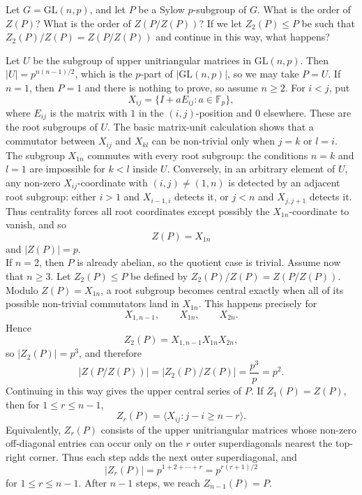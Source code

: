 \documentclass[../Odyssey_Project.tex]{subfiles}
\begin{document}
\begin{exercise}
\label{ex:8.3}
Let $G = \mathrm{GL}(n,p)$, and let $P$ be a Sylow $p$-subgroup of $G$. What is the order of $Z(P)$? What is the order of $Z(P/Z(P))$? If we let $Z_2(P) \leq P$ be such that $Z_2(P)/Z(P) = Z(P/Z(P))$ and continue in this way, what happens?
\end{exercise}
\begin{solution}
Let $U$ be the subgroup of upper unitriangular matrices in $\mathrm{GL}(n,p)$. Then $\lvert U\rvert=p^{n(n-1)/2}$, which is the $p$-part of $\lvert \mathrm{GL}(n,p)\rvert$, so we may take $P=U$. If $n=1$, then $P=1$ and there is nothing to prove, so assume $n\geq 2$. For $i<j$, put
\[
    X_{ij}=\{I+aE_{ij}:a\in\mathbb{F}_p\},
\]
where $E_{ij}$ is the matrix with $1$ in the $(i,j)$-position and $0$ elsewhere. These are the root subgroups of $U$. The basic matrix-unit calculation shows that a commutator between $X_{ij}$ and $X_{kl}$ can be non-trivial only when $j=k$ or $l=i$.\\
The subgroup $X_{1n}$ commutes with every root subgroup: the conditions $n=k$ and $l=1$ are impossible for $k<l$ inside $U$. Conversely, in an arbitrary element of $U$, any non-zero $X_{ij}$-coordinate with $(i,j)\neq(1,n)$ is detected by an adjacent root subgroup: either $i>1$ and $X_{i-1,i}$ detects it, or $j<n$ and $X_{j,j+1}$ detects it. Thus centrality forces all root coordinates except possibly the $X_{1n}$-coordinate to vanish, and so
\[
    Z(P)=X_{1n}
\]
and $\lvert Z(P)\rvert=p$.\\
If $n=2$, then $P$ is already abelian, so the quotient case is trivial. Assume now that $n\geq 3$. Let $Z_2(P)\leq P$ be defined by $Z_2(P)/Z(P)=Z(P/Z(P))$. Modulo $Z(P)=X_{1n}$, a root subgroup becomes central exactly when all of its possible non-trivial commutators land in $X_{1n}$. This happens precisely for
\[
    X_{1,n-1},\qquad X_{1n},\qquad X_{2n}.
\]
Hence
\[
    Z_2(P)=X_{1,n-1}X_{1n}X_{2n},
\]
so $\lvert Z_2(P)\rvert=p^3$, and therefore
\[
    \lvert Z(P/Z(P))\rvert
    =\lvert Z_2(P)/Z(P)\rvert
    =\frac{p^3}{p}
    =p^2.
\]
Continuing in this way gives the upper central series of $P$. If $Z_1(P)=Z(P)$, then for $1\leq r\leq n-1$,
\[
    Z_r(P)=\langle X_{ij}:j-i\geq n-r\rangle.
\]
Equivalently, $Z_r(P)$ consists of the upper unitriangular matrices whose non-zero off-diagonal entries can occur only on the $r$ outer superdiagonals nearest the top-right corner. Thus each step adds the next outer superdiagonal, and
\[
    \lvert Z_r(P)\rvert=p^{1+2+\cdots+r}=p^{r(r+1)/2}
\]
for $1\leq r\leq n-1$. After $n-1$ steps, we reach $Z_{n-1}(P)=P$.
\end{solution}
\end{document}
